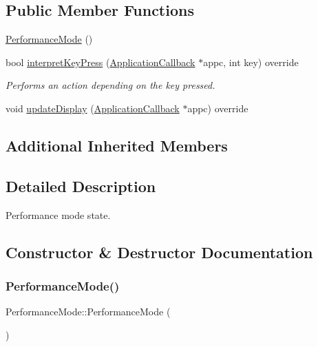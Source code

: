 \subsection*{Public Member Functions}
\begin{DoxyCompactItemize}
\item 
\hyperlink{classdrumpi_1_1PerformanceMode_ae6b54e1ab335d25f6ad1aa52ea89e4df}{Performance\+Mode} ()
\item 
bool \hyperlink{classdrumpi_1_1PerformanceMode_a37c7c2eed9185a2211e389eebfd60262}{interpret\+Key\+Press} (\hyperlink{classdrumpi_1_1ApplicationCallback}{Application\+Callback} $\ast$appc, int key) override
\begin{DoxyCompactList}\small\item\em Performs an action depending on the key pressed. \end{DoxyCompactList}\item 
void \hyperlink{classdrumpi_1_1PerformanceMode_afc7bfd820bb21e4003ffe9ef189fa290}{update\+Display} (\hyperlink{classdrumpi_1_1ApplicationCallback}{Application\+Callback} $\ast$appc) override
\end{DoxyCompactItemize}
\subsection*{Additional Inherited Members}


\subsection{Detailed Description}
Performance mode state. 

\subsection{Constructor \& Destructor Documentation}
\mbox{\label{classdrumpi_1_1PerformanceMode_ae6b54e1ab335d25f6ad1aa52ea89e4df}} 
\subsubsection{\texorpdfstring{Performance\+Mode()}{PerformanceMode()}}
{\footnotesize\ttfamily Performance\+Mode\+::\+Performance\+Mode (\begin{DoxyParamCaption}{ }\end{DoxyParamCaption})}

